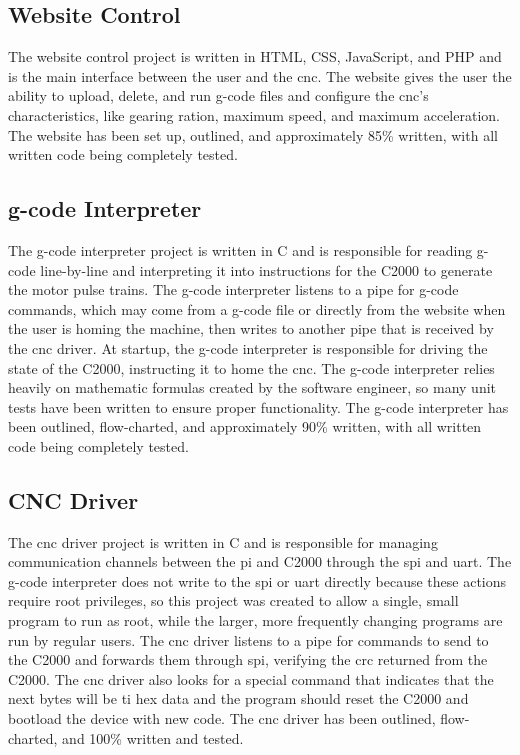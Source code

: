 \subsection{Website Control}
The website control project is written in HTML, CSS, JavaScript, and PHP and is the main interface between the user and the \gls{cnc}.
The website gives the user the ability to upload, delete, and run g-code files and configure the \gls{cnc}'s characteristics, like gearing ration, maximum speed, and maximum acceleration.
The website has been set up, outlined, and approximately 85\% written, with all written code being completely tested.

\subsection{g-code Interpreter}
The g-code interpreter project is written in C and is responsible for reading g-code line-by-line and interpreting it into instructions for the C2000 to generate the motor pulse trains.
The g-code interpreter listens to a pipe for g-code commands, which may come from a g-code file or directly from the website when the user is homing the machine, then writes to another pipe that is received by the \gls{cnc} driver.
At startup, the g-code interpreter is responsible for driving the state of the C2000, instructing it to home the \gls{cnc}.
The g-code interpreter relies heavily on mathematic formulas created by the software engineer, so many unit tests have been written to ensure proper functionality.
The g-code interpreter has been outlined, flow-charted, and approximately 90\% written, with all written code being completely tested.

\subsection{CNC Driver}
The \gls{cnc} driver project is written in C and is responsible for managing communication channels between the \gls{pi} and C2000 through the \gls{spi} and \gls{uart}.
The g-code interpreter does not write to the \gls{spi} or \gls{uart} directly because these actions require root privileges, so this project was created to allow a single, small program to run as root, while the larger, more frequently changing programs are run by regular users.
The \gls{cnc} driver listens to a pipe for commands to send to the C2000 and forwards them through \gls{spi}, verifying the \gls{crc} returned from the C2000.
The \gls{cnc} driver also looks for a special command that indicates that the next bytes will be \gls{ti} hex data and the program should reset the C2000 and bootload the device with new code.
The \gls{cnc} driver has been outlined, flow-charted, and 100\% written and tested.

